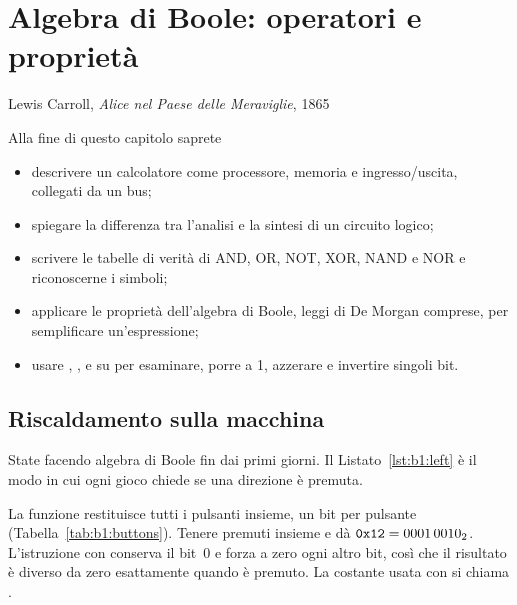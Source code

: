 \chapter{Algebra di Boole: operatori e proprietà}
\label{ch:boole1}

  {Lewis Carroll, \emph{Alice nel Paese delle Meraviglie}, 1865}

\begin{chapgoals}
Alla fine di questo capitolo saprete
\begin{itemize}
\item descrivere un calcolatore come processore, memoria e ingresso/uscita, collegati da un bus;
\item spiegare la differenza tra l'analisi e la sintesi di un circuito logico;
\item scrivere le tabelle di verità di AND, OR, NOT, XOR, NAND e NOR e riconoscerne i simboli;
\item applicare le proprietà dell'algebra di Boole, leggi di De Morgan comprese, per semplificare un'espressione;
\item usare , ,  e  su \riscv per esaminare, porre a 1, azzerare e invertire singoli bit.
\end{itemize}
\end{chapgoals}


\section{Riscaldamento sulla macchina}

State facendo algebra di Boole fin dai primi giorni. Il
Listato~\ref{lst:b1:left} è il modo in cui ogni gioco \prg chiede se una
direzione è premuta.


La funzione  restituisce tutti i pulsanti insieme, un
bit per pulsante (Tabella~\ref{tab:b1:buttons}). Tenere premuti insieme
 e  dà $\texttt{0x12} = 0001\,0010_2$. L'istruzione 
con  conserva il bit~0 e forza a zero ogni altro bit, così che il
risultato è diverso da zero esattamente quando  è premuto. La
costante usata con  si chiama .

